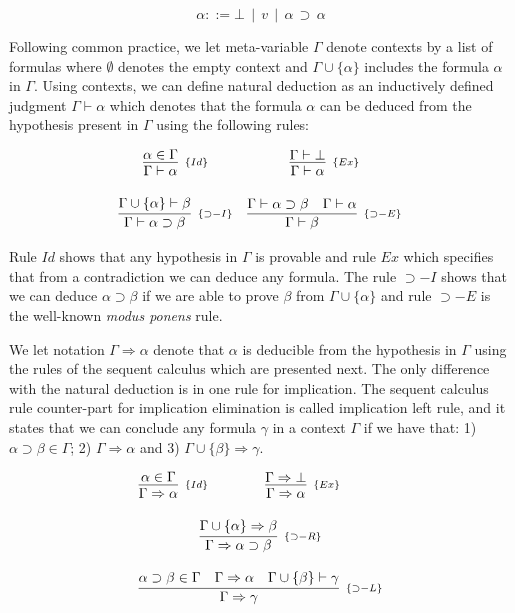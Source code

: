 \[\alpha ::= \bot \,\mid\,v\,\mid\,\alpha\,\supset\,\alpha\]



Following common practice, we let meta-variable $\Gamma$ denote contexts by a list of formulas where $\emptyset$ denotes
the empty context and $\Gamma \cup \{\alpha\}$ includes the formula $\alpha$ in $\Gamma$. Using contexts, we
can define natural deduction as an inductively defined judgment $\Gamma \vdash \alpha$ which denotes that the
formula $\alpha$ can be deduced from the hypothesis present in $\Gamma$ using the following rules:


\[
\begin{array}{cc}
\infer[_{\{Id\}}]{\Gamma \vdash \alpha}{\alpha \in \Gamma} &
\infer[_{\{Ex\}}]{\Gamma \vdash \alpha}{\Gamma \vdash \bot}\\ \\
\infer[_{\{\supset-I\}}]{\Gamma \vdash \alpha \supset \beta}{\Gamma \cup \{\alpha\} \vdash \beta} &
\infer[_{\{\supset-E\}}]{\Gamma \vdash \beta}{\Gamma \vdash \alpha \supset \beta & \Gamma \vdash \alpha}
\end{array}
\]


Rule $Id$ shows that any hypothesis in $\Gamma$ is provable and rule $Ex$ which specifies that from a
contradiction we can deduce any formula. The rule $\supset-I$ shows that we can deduce $\alpha\supset \beta$
if we are able to prove $\beta$ from $\Gamma\cup\{\alpha\}$ and rule $\supset-E$ is the well-known
\emph{modus ponens} rule.


We let notation $\Gamma\Rightarrow\alpha$ denote that $\alpha$ is deducible from the hypothesis in $\Gamma$
using the rules of the sequent calculus which are presented next. The only difference with the natural deduction
is in one rule for implication. The sequent calculus rule counter-part for implication elimination is called
implication left rule, and it states that we can conclude any formula $\gamma$ in a context $\Gamma$ if we have
that: 1) $\alpha \supset \beta \in \Gamma$; 2) $\Gamma \Rightarrow \alpha$ and 3) $\Gamma \cup \{\beta\} \Rightarrow \gamma$.

\[
\begin{array}{cc}
\infer[_{\{Id\}}]{\Gamma \Rightarrow \alpha}{\alpha \in \Gamma} &
\infer[_{\{Ex\}}]{\Gamma \Rightarrow \alpha}{\Gamma \Rightarrow \bot}\\ \\
\multicolumn{2}{c}{\infer[_{\{\supset-R\}}]{\Gamma \Rightarrow \alpha \supset \beta}{\Gamma \cup \{\alpha\} \Rightarrow \beta}} \\ \\
\multicolumn{2}{c}{\infer[_{\{\supset-L\}}]{\Gamma \Rightarrow \gamma}{
                                                       \alpha \supset \beta \in
                                                        \Gamma &
                                                        \Gamma \Rightarrow
                                                        \alpha & \Gamma \cup
                                                        \{\beta\}\vdash \gamma}}
\end{array}
\]

